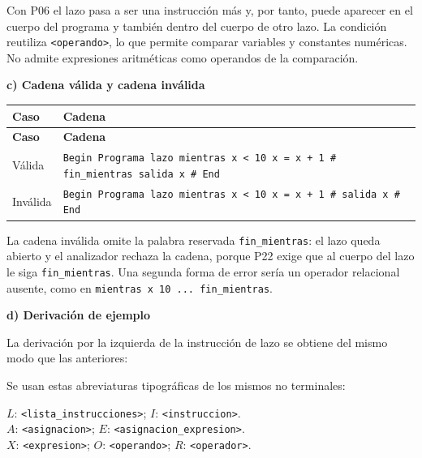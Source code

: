 \documentclass[11pt,letterpaper]{article}
\newcommand{\apartado}[1]{\par\Needspace{4\baselineskip}\medskip\noindent\textbf{#1}\par\nobreak\smallskip}
\newcommand{\nt}[1]{\texttt{\textless #1\textgreater}}
\begin{document}
Con P06 el lazo pasa a ser una instrucción más y, por tanto, puede aparecer en el cuerpo del
programa y también dentro del cuerpo de otro lazo. La condición reutiliza \nt{operando}, lo que
permite comparar variables y constantes numéricas. No admite expresiones aritméticas como operandos de la comparación.

\apartado{c) Cadena válida y cadena inválida}

\begin{longtable}{|L{2.3cm}|L{\dimexpr\textwidth-2.3cm-4\arrayrulewidth\relax}|}
\hline
{}\textbf{Caso} & \textbf{Cadena}\\\hline
\endfirsthead
\hline
{}\textbf{Caso} & \textbf{Cadena}\\\hline
\endhead

\textcolor{verde}{Válida} &
\texttt{Begin Programa lazo mientras x < 10 x = x + 1 \# fin\_mientras salida x \# End}\\\hline
\textcolor{rojo}{Inválida} &
\texttt{Begin Programa lazo mientras x < 10 x = x + 1 \# salida x \# End}\\\hline
\end{longtable}

La cadena inválida omite la palabra reservada \texttt{fin\_mientras}: el lazo queda abierto y el
analizador rechaza la cadena, porque P22 exige que al cuerpo del lazo le siga \texttt{fin\_mientras}.
Una segunda forma de error sería un operador relacional ausente, como en
\texttt{mientras x 10 ... fin\_mientras}.

\apartado{d) Derivación de ejemplo}

La derivación por la izquierda de la instrucción de lazo se obtiene del mismo modo que las
anteriores:

Se usan estas abreviaturas tipográficas de los mismos no terminales:

$L$: \nt{lista\_instrucciones}; $I$: \nt{instruccion}.\\
$A$: \nt{asignacion}; $E$: \nt{asignacion\_expresion}.\\
$X$: \nt{expresion}; $O$: \nt{operando}; $R$: \nt{operador}.
\end{document}
